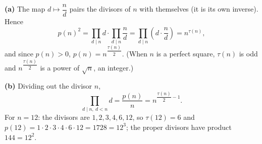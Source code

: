 \textbf{(a)} The map $d\mapsto\dfrac {n}{d}$ pairs the divisors of $n$ with themselves (it is its own inverse). Hence
\[
p(n)^2=\prod_{d\mid n}d\cdot\prod_{d\mid n}\dfrac {n}{d}=\prod_{d\mid n}\left(d\cdot\dfrac {n}{d}\right)=n^{\tau(n)} ,
\]
and since $p(n)>0$, $p(n)=n^{\dfrac{\tau(n)}{2}}$. (When $n$ is a perfect square, $\tau(n)$ is odd and $n^{\dfrac{\tau(n)}{2}}$ is a power of $\sqrt n$, an integer.)

\textbf{(b)} Dividing out the divisor $n$,
\[
\prod_{d\mid n,\ d<n}d=\dfrac{p(n)}{n}=\boxed{n^{\dfrac{\tau(n)}{2}-1}} .
\]
For $n=12$: the divisors are $1,2,3,4,6,12$, so $\tau(12)=6$ and $p(12)=1\cdot2\cdot3\cdot4\cdot6\cdot12=1728=12^3$; the proper divisors have product $144=12^{2}$.
